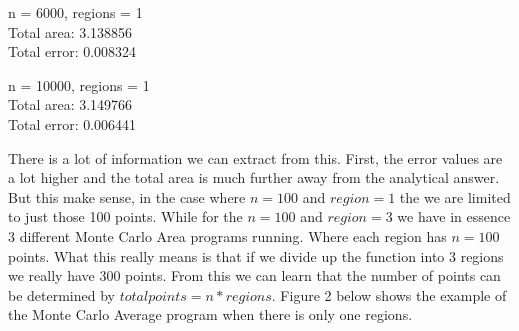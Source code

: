 \documentclass[12pt]{article}
\begin{document}
\begin{center}
n = 6000, regions = 1 \\
Total area: 3.138856 \\
Total error: 0.008324 \\
\end{center}

\begin{center}
n = 10000, regions = 1 \\
Total area: 3.149766 \\
Total error: 0.006441 \\
\end{center}


There is a lot of information we can extract from this. First, the error values are a lot higher and the total area is much further away from the analytical answer. But this make sense, in the case where $n = 100$ and $region = 1$ the we are limited to just those 100 points. While for the $n = 100$ and $region = 3$ we have in essence 3 different Monte Carlo Area programs running. Where each region has $n = 100$ points. What this really means is that if we divide up the function into 3 regions we really have 300 points. From this we can learn that the number of points can be determined by $total points = n * regions$. Figure 2 below shows the example of the Monte Carlo Average program when there is only one regions.
\end{document}
